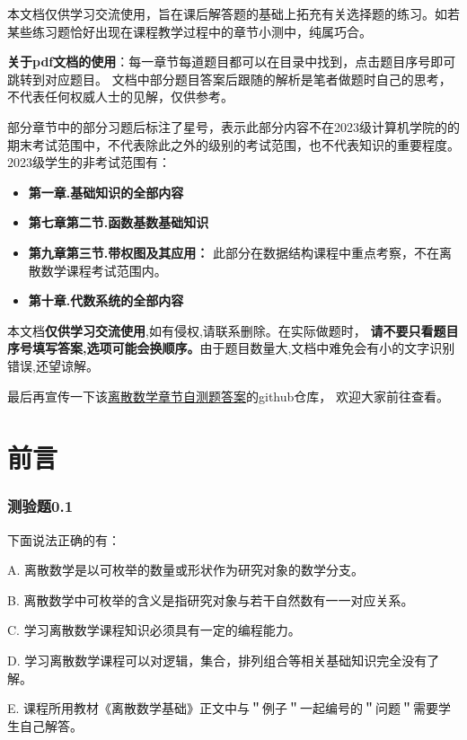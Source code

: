\documentclass[UTF8, heading=true]{ctexart}
\begin{document}
本文档仅供学习交流使用，旨在课后解答题的基础上拓充有关选择题的练习。如若某些练习题恰好出现在课程教学过程中的章节小测中，纯属巧合。

\textbf{关于pdf文档的使用}：每一章节每道题目都可以在目录中找到，点击题目序号即可跳转到对应题目。
文档中部分题目答案后跟随的解析是笔者做题时自己的思考，不代表任何权威人士的见解，仅供参考。

部分章节中的部分习题后标注了星号，表示此部分内容不在2023级计算机学院的的期末考试范围中，不代表除此之外的级别的考试范围，也不代表知识的重要程度。
2023级学生的非考试范围有：
\begin{itemize}
  \item \textbf{第一章.基础知识的全部内容}
  \item \textbf{第七章第二节.函数基数基础知识}
  \item \textbf{第九章第三节.带权图及其应用：} 此部分在数据结构课程中重点考察，不在离散数学课程考试范围内。
  \item \textbf{第十章.代数系统的全部内容}
\end{itemize}

本文档\textbf{仅供学习交流使用},如有侵权,请联系删除。在实际做题时，
\textbf{请不要只看题目序号填写答案,选项可能会换顺序。}由于题目数量大,文档中难免会有小的文字识别错误,还望谅解。

最后再宣传一下该\href{https://github.com/BlackMaple1203/SYSU-Discrete-Mathematics-Exam-Answers}{离散数学章节自测题答案}的github仓库，
欢迎大家前往查看。
\clearpage

{}


\section*{前言}

\subsubsection{测验题0.1}

下面说法正确的有：

A. 离散数学是以可枚举的数量或形状作为研究对象的数学分支。

B. 离散数学中可枚举的含义是指研究对象与若干自然数有一一对应关系。

C. 学习离散数学课程知识必须具有一定的编程能力。

D. 学习离散数学课程可以对逻辑，集合，排列组合等相关基础知识完全没有了解。

E. 课程所用教材《离散数学基础》正文中与＂例子＂一起编号的＂问题＂需要学生自己解答。
\end{document}
